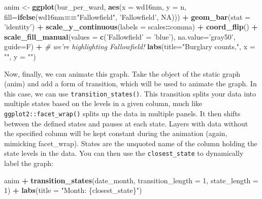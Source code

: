 \documentclass[]{book}
\newenvironment{Shaded}{\begin{snugshade}}{\end{snugshade}}
\newcommand{\CommentTok}[1]{\textcolor[rgb]{0.56,0.35,0.01}{\textit{#1}}}
\newcommand{\DataTypeTok}[1]{\textcolor[rgb]{0.13,0.29,0.53}{#1}}
\newcommand{\DecValTok}[1]{\textcolor[rgb]{0.00,0.00,0.81}{#1}}
\newcommand{\KeywordTok}[1]{\textcolor[rgb]{0.13,0.29,0.53}{\textbf{#1}}}
\newcommand{\NormalTok}[1]{#1}
\newcommand{\OperatorTok}[1]{\textcolor[rgb]{0.81,0.36,0.00}{\textbf{#1}}}
\newcommand{\OtherTok}[1]{\textcolor[rgb]{0.56,0.35,0.01}{#1}}
\newcommand{\StringTok}[1]{\textcolor[rgb]{0.31,0.60,0.02}{#1}}
\begin{document}
\begin{Shaded}
\begin{Highlighting}[]
\NormalTok{anim <-}\StringTok{ }\KeywordTok{ggplot}\NormalTok{(bur_per_ward, }\KeywordTok{aes}\NormalTok{(}\DataTypeTok{x =}\NormalTok{ wd16nm, }\DataTypeTok{y =}\NormalTok{ n, }\DataTypeTok{fill=}\KeywordTok{ifelse}\NormalTok{(wd16nm}\OperatorTok{==}\StringTok{"Fallowfield"}\NormalTok{, }\StringTok{'Fallowfield'}\NormalTok{, }\OtherTok{NA}\NormalTok{))) }\OperatorTok{+}
\StringTok{  }\KeywordTok{geom_bar}\NormalTok{(}\DataTypeTok{stat =} \StringTok{'identity'}\NormalTok{) }\OperatorTok{+}
\StringTok{  }\KeywordTok{scale_y_continuous}\NormalTok{(}\DataTypeTok{labels =}\NormalTok{ scales}\OperatorTok{::}\NormalTok{comma) }\OperatorTok{+}
\StringTok{  }\KeywordTok{coord_flip}\NormalTok{() }\OperatorTok{+}
\StringTok{  }\KeywordTok{scale_fill_manual}\NormalTok{(}\DataTypeTok{values =} \KeywordTok{c}\NormalTok{(}\StringTok{'Fallowfield'}\NormalTok{ =}\StringTok{ 'blue'}\NormalTok{), }\DataTypeTok{na.value=}\StringTok{'gray50'}\NormalTok{, }\DataTypeTok{guide=}\NormalTok{F) }\OperatorTok{+}\StringTok{ }\CommentTok{# we're highlighting Fallowfield!}
\StringTok{  }\KeywordTok{labs}\NormalTok{(}\DataTypeTok{title=}\StringTok{"Burglary counts,"}\NormalTok{,}
       \DataTypeTok{x =} \StringTok{""}\NormalTok{,}
       \DataTypeTok{y =} \StringTok{""}\NormalTok{) }
\end{Highlighting}
\end{Shaded}

Now, finally, we can animate this graph. Take the object of the static graph (anim) and add a form of transition, which will be used to animate the graph. In this case, we can use \texttt{transition\_states()}. This transition splits your data into multiple states based on the levels in a given column, much like \texttt{ggplot2::facet\_wrap()} splits up the data in multiple panels. It then shifts between the defined states and pauses at each state. Layers with data without the specified column will be kept constant during the animation (again, mimicking facet\_wrap). States are the unquoted name of the column holding the state levels in the data. You can then use the \texttt{closest\_state} to dynamically label the graph:

\begin{Shaded}
\begin{Highlighting}[]
\NormalTok{anim }\OperatorTok{+}\StringTok{ }\KeywordTok{transition_states}\NormalTok{(date_month, }\DataTypeTok{transition_length =} \DecValTok{1}\NormalTok{, }\DataTypeTok{state_length =} \DecValTok{1}\NormalTok{) }\OperatorTok{+}
\StringTok{  }\KeywordTok{labs}\NormalTok{(}\DataTypeTok{title =} \StringTok{"Month: \{closest_state\}"}\NormalTok{)}
\end{Highlighting}
\end{Shaded}
\end{document}

